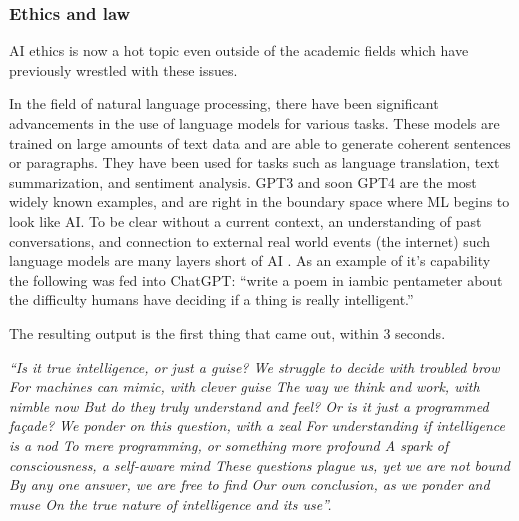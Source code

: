 \subsubsection{Ethics and law}
AI ethics is now a hot topic even outside of the academic fields which have previously wrestled with these issues.\par
In the field of natural language processing, there have been significant advancements in the use of language models for various tasks. These models are trained on large amounts of text data and are able to generate coherent sentences or paragraphs. They have been used for tasks such as language translation, text summarization, and sentiment analysis. GPT3 and soon GPT4 are the most widely known examples, and are right in the boundary space where ML begins to look like AI. To be clear without a current context, an understanding of past conversations, and connection to external real world events (the internet) such language models are many layers short of AI \cite{elkins2020can, marcus2020gpt}. As an example of it's capability the following was fed into ChatGPT: ``write a poem in iambic pentameter about the difficulty humans have deciding if a thing is really intelligent.''\par
The resulting output is the first thing that came out, within 3 seconds.\par
\textit{``Is it true intelligence, or just a guise?
We struggle to decide with troubled brow
For machines can mimic, with clever guise
The way we think and work, with nimble now
But do they truly understand and feel?
Or is it just a programmed façade?
We ponder on this question, with a zeal
For understanding if intelligence is a nod
To mere programming, or something more profound
A spark of consciousness, a self-aware mind
These questions plague us, yet we are not bound
By any one answer, we are free to find
Our own conclusion, as we ponder and muse
On the true nature of intelligence and its use''.}

